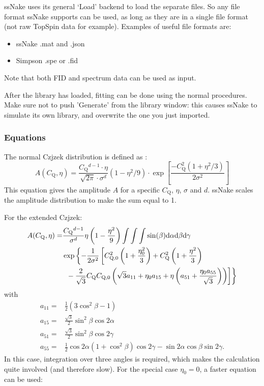 \documentclass[11pt,a4paper]{article}
\begin{document}
ssNake uses its general `Load' backend to load the separate files. So any file format ssNake supports can be used, as long as they are in a single file format (not raw TopSpin data for example). Examples of useful file formats are:

\begin{itemize}
\item ssNake .mat and .json
\item Simpson .spe or .fid
\end{itemize}

Note that both FID and spectrum data can be used as input.

After the library has loaded, fitting can be done using the normal procedures. Make sure not to push 'Generate' from the library window: this causes ssNake to simulate its own library, and overwrite the one you just imported.



\subsubsection*{Equations}

The normal Czjzek distribution is defined as \cite{Grimminck2011Easy}:
\begin{equation}
  A(C_\text{Q},\eta) = \frac{C_\text{Q}{}^{d - 1} \cdot \eta}{\sqrt{2\pi} \cdot \sigma^d} (1 - \eta^2 / 9) \cdot
  \exp\left[\frac{-C_\text{Q}^2 (1 + \eta^2/3)} {2\sigma^2}   \right]
\end{equation}
This equation gives the amplitude $A$ for a specific $C_\text{Q}$, $\eta$, $\sigma$ and $d$. ssNake
scales the amplitude distribution to make the sum equal to 1.


For the extended Czjzek:
\begin{align}
  A(C_\text{Q},\eta) = & \frac{C_\text{Q}{}^{d-1}}{\sigma^d} \eta \left(1 - \frac{\eta^2}{9} \right)
  \int \int \int \sin(\beta) \text{d}\alpha \text{d}\beta \text{d}\gamma \nonumber \\
  & \exp \left\{ -\frac{1}{2\sigma^2} \left[ C_\text{Q,0}^2 \left(1 + \frac{\eta_0^2}{3}\right) +
  C_\text{Q}^2 \left(1+ \frac{\eta^2}{3}\right) \right.\right. \\
  & \left.\vphantom{\frac{a^1}{1}} \left.\vphantom{\frac{a^1}{1}} - \frac{2}{\sqrt{3}} C_\text{Q} C_\text{Q,0} 
  \left( \sqrt{3} a_{11} + \eta_0 a_{15} + \eta \left(
 a_{51} + \frac{\eta_0 a_{55}}{\sqrt{3}} \right) \right) \right] \right\} \nonumber
\end{align}
with
\begin{align}
  a_{11} = & \frac{1}{2} (3\cos^2\beta - 1)\\
  a_{15} = & \frac{\sqrt{3}}{2} \sin^2\beta \cos 2\alpha \\
  a_{51} = & \frac{\sqrt{3}}{2} \sin^2\beta \cos 2\gamma \\
  a_{55} = & \frac{1}{2} \cos 2\alpha (1 + \cos^2\beta) \cos2\gamma - \sin 2 \alpha \cos \beta \sin
  2 \gamma.
\end{align}
In this case, integration over three angles is required, which makes the calculation quite involved
(and therefore slow). For the special case $\eta_0=0$, a faster equation can be used:
\end{document}
